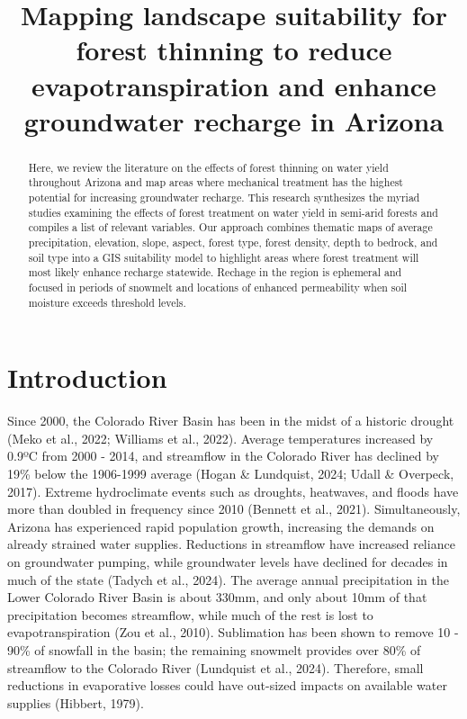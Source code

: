 \documentclass[
]{agujournal2019}
\begin{document}
\title{Mapping landscape suitability for forest thinning to reduce
evapotranspiration and enhance groundwater recharge in Arizona}



\begin{abstract}
Here, we review the literature on the effects of forest thinning on
water yield throughout Arizona and map areas where mechanical treatment
has the highest potential for increasing groundwater recharge. This
research synthesizes the myriad studies examining the effects of forest
treatment on water yield in semi-arid forests and compiles a list of
relevant variables. Our approach combines thematic maps of average
precipitation, elevation, slope, aspect, forest type, forest density,
depth to bedrock, and soil type into a GIS suitability model to
highlight areas where forest treatment will most likely enhance recharge
statewide. Rechage in the region is ephemeral and focused in periods of
snowmelt and locations of enhanced permeability when soil moisture
exceeds threshold levels.
\end{abstract}




\section{Introduction}\label{introduction}

Since 2000, the Colorado River Basin has been in the midst of a historic
drought (Meko et al., 2022; Williams et al., 2022). Average temperatures
increased by 0.9ºC from 2000 - 2014, and streamflow in the Colorado
River has declined by 19\% below the 1906-1999 average (Hogan \&
Lundquist, 2024; Udall \& Overpeck, 2017). Extreme hydroclimate events
such as droughts, heatwaves, and floods have more than doubled in
frequency since 2010 (Bennett et al., 2021). Simultaneously, Arizona has
experienced rapid population growth, increasing the demands on already
strained water supplies. Reductions in streamflow have increased
reliance on groundwater pumping, while groundwater levels have declined
for decades in much of the state (Tadych et al., 2024). The average
annual precipitation in the Lower Colorado River Basin is about 330mm,
and only about 10mm of that precipitation becomes streamflow, while much
of the rest is lost to evapotranspiration (Zou et al., 2010).
Sublimation has been shown to remove 10 - 90\% of snowfall in the basin;
the remaining snowmelt provides over 80\% of streamflow to the Colorado
River (Lundquist et al., 2024). Therefore, small reductions in
evaporative losses could have out-sized impacts on available water
supplies (Hibbert, 1979).
\end{document}
